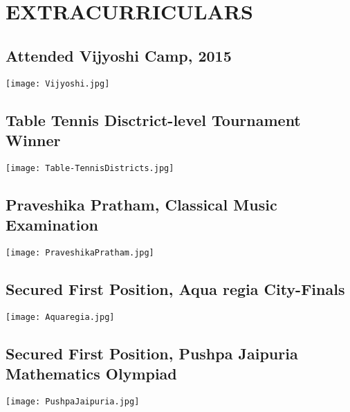 \documentclass{article}
\begin{document}
\section{EXTRACURRICULARS}
	\subsection{Attended Vijyoshi Camp, 2015}
\begin{center}
	\texttt{[image: Vijyoshi.jpg]}{\centering}
\end{center}
	\subsection{Table Tennis Disctrict-level Tournament Winner}
\begin{center}
	\texttt{[image: Table-TennisDistricts.jpg]}{\centering}
\end{center}
	\subsection{Praveshika Pratham, Classical Music Examination}
\begin{center}
	\texttt{[image: PraveshikaPratham.jpg]}{\centering}
\end{center}
	\subsection{Secured First Position, Aqua regia City-Finals}
\begin{center}
	\texttt{[image: Aquaregia.jpg]}{\centering}
\end{center}
	\subsection{Secured First Position, Pushpa Jaipuria Mathematics Olympiad}
\begin{center}
	\texttt{[image: PushpaJaipuria.jpg]}{\centering}
\end{center}
\end{document}
